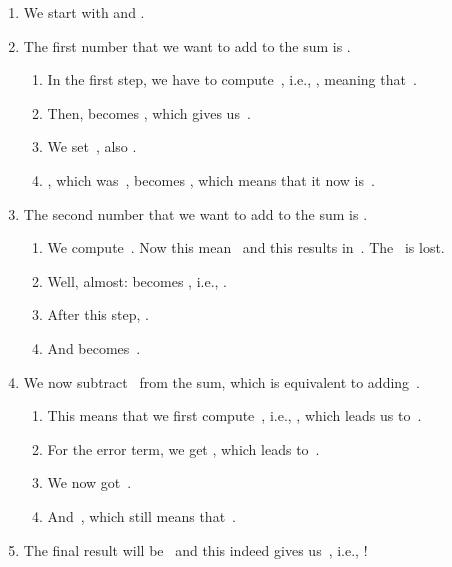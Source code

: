 \begin{enumerate}%
\item We start with  and .%
%
\item The first number that we want to add to the sum is .%
\begin{enumerate}%
\item In the first step, we have to compute~, i.e., , meaning that~.%
%
\item Then,  becomes , which gives us~.%
\item We set~, also .%
\item {}, which was~, becomes , which means that it now is~.%
\end{enumerate}%
%
\item The second number that we want to add to the sum is .%
\begin{enumerate}%
%
\item We compute~. %
Now this mean~ and this results in~. %
The~ is lost.%
%
\item Well, almost: %
 becomes , i.e., .%
%
\item After this step, .%
%
\item And  becomes~.%
\end{enumerate}%
%
\item We now subtract~ from the sum, which is equivalent to adding~.%
%
\begin{enumerate}%
\item This means that we first compute~, i.e., , which leads us to~.%
%
\item For the error term, we get , which leads to~.%
%
\item We now got~.%
%
\item And~, which still means that~.%
\end{enumerate}%
%
\item The final result will be~ and this indeed gives us~, i.e., !
%
\end{enumerate}%
